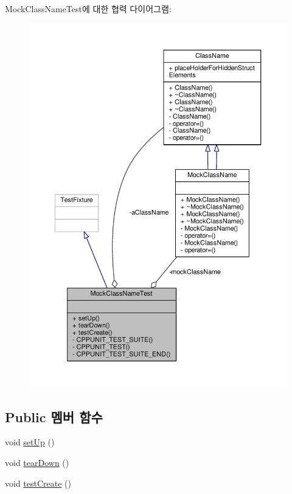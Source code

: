 Mock\+Class\+Name\+Test에 대한 협력 다이어그램\+:
\nopagebreak
\begin{figure}[H]
\begin{center}
\leavevmode
\includegraphics[width=350pt]{class_mock_class_name_test__coll__graph}
\end{center}
\end{figure}
\subsection*{Public 멤버 함수}
\begin{DoxyCompactItemize}
\item 
void \hyperlink{class_mock_class_name_test_a63326a1b70b6e3f070e51687798e02de}{set\+Up} ()
\item 
void \hyperlink{class_mock_class_name_test_ab804e0f66def63262c1d6b4e3d2a2bd7}{tear\+Down} ()
\item 
void \hyperlink{class_mock_class_name_test_a0dc4c4586e1a48d47ba2b95f5ecd771e}{test\+Create} ()
\end{DoxyCompactItemize}
